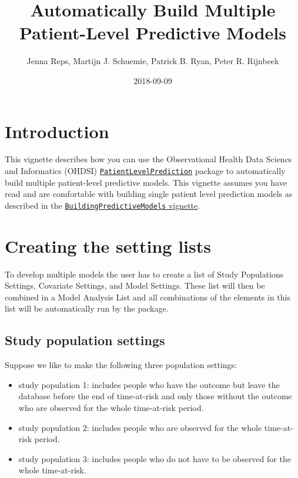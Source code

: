 \documentclass[]{article}
\title{Automatically Build Multiple Patient-Level Predictive Models}
\author{Jenna Reps, Martijn J. Schuemie, Patrick B. Ryan, Peter R. Rijnbeek}
\date{2018-09-09}
\providecommand{\tightlist}{%
  \setlength{\itemsep}{0pt}\setlength{\parskip}{0pt}}
\begin{document}
\maketitle

{
\setcounter{tocdepth}{2}
\tableofcontents
}
\section{Introduction}\label{introduction}

This vignette describes how you can use the Observational Health Data
Sciencs and Informatics (OHDSI)
\href{http://github.com/OHDSI/PatientLevelPrediction}{\texttt{PatientLevelPrediction}}
package to automatically build multiple patient-level predictive models.
This vignette assumes you have read and are comfortable with building
single patient level prediction models as described in the
\href{https://github.com/OHDSI/PatientLevelPrediction/blob/master/inst/doc/BuildingPredictiveModels.pdf}{\texttt{BuildingPredictiveModels}
vignette}.

\section{Creating the setting lists}\label{creating-the-setting-lists}

To develop multiple models the user has to create a list of Study
Populations Settings, Covariate Settings, and Model Settings. These list
will then be combined in a Model Analysis List and all combinations of
the elements in this list will be automatically run by the package.

\subsection{Study population settings}\label{study-population-settings}

Suppose we like to make the following three population settings:

\begin{itemize}
\tightlist
\item
  study population 1: includes people who have the outcome but leave the
  database before the end of time-at-risk and only those without the
  outcome who are observed for the whole time-at-risk period.
\item
  study population 2: includes people who are observed for the whole
  time-at-risk period.
\item
  study population 3: includes people who do not have to be observed for
  the whole time-at-risk.
\end{itemize}
\end{document}
